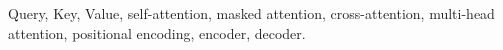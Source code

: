 
Query, Key, Value, self-attention, masked attention, cross-attention, multi-head attention, positional encoding, encoder, decoder.

